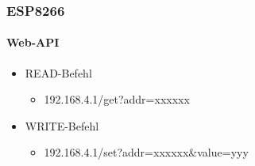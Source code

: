 \documentclass{beamer}
\begin{document}
\begin{frame}

	\frametitle{ESP8266}
	\framesubtitle{Web-API}
	\begin{itemize}
		\item READ-Befehl
		\begin{itemize}
			\item 192.168.4.1/get?addr=xxxxxx
		\end{itemize}
		\item WRITE-Befehl
		\begin{itemize}
			\item 192.168.4.1/set?addr=xxxxxx\&value=yyy
		\end{itemize}
	\end{itemize}
	
\end{frame}

\end{document}
